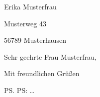 \documentclass{hu-berlin-letter}
\begin{document}
\begin{letter}{%
  Erika Musterfrau\par
  Musterweg 43\par
  56789 Musterhausen%
}
\opening{Sehr geehrte Frau Musterfrau,}
\blindtext[2]
\clearpage
\blindtext
\closing{Mit freundlichen Grüßen}
\ps PS: \dots
{}
\end{letter}
\end{document}
